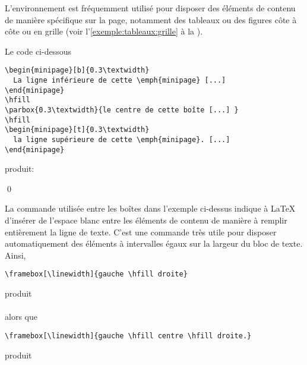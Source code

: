 L'environnement  est fréquemment utilisé pour disposer
des éléments de contenu de manière spécifique sur la page, notamment
des tableaux ou des figures côte à côte ou en grille (voir
l'\autoref{exemple:tableaux:grille} à la
).

\begin{exemple}
  Le code ci-dessous
\begin{lstlisting}
\begin{minipage}[b]{0.3\textwidth}
  La ligne inférieure de cette \emph{minipage} [...]
\end{minipage}
\hfill
\parbox{0.3\textwidth}{le centre de cette boîte [...] }
\hfill
\begin{minipage}[t]{0.3\textwidth}
  la ligne supérieure de cette \emph{minipage}. [...]
\end{minipage}
\end{lstlisting}
  produit: \\[0.5\baselineskip]
  \begin{minipage}{\textwidth}
    \makebox[0pt][l]{\color{lightgray}\rule{\textwidth}{0.7pt}}\relax
     \hfill {}
    \hfill {}
  \end{minipage}
  \qed
\end{exemple}

La commande \cmd{\hfill} utilisée entre les boîtes dans l'exemple ci-dessus
indique à {\LaTeX} d'insérer de l'espace blanc entre les éléments de
contenu de manière à remplir entièrement la ligne de texte. C'est une
commande très utile pour disposer automatiquement des éléments à
intervalles égaux sur la largeur du bloc de texte. Ainsi,
\begin{lstlisting}
\framebox[\linewidth]{gauche \hfill droite}
\end{lstlisting}
produit \\[0.5\baselineskip]
 \\[0.5\baselineskip]
alors que
\begin{lstlisting}
\framebox[\linewidth]{gauche \hfill centre \hfill droite.}
\end{lstlisting}
produit \\[0.5\baselineskip]



